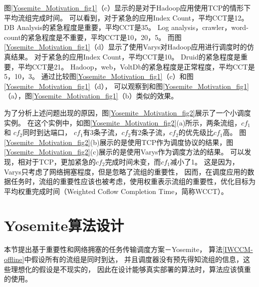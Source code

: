 图\ref{Yosemite_Motivation_fig1}（c）显示的是对于Hadoop应用使用TCP的情形下平均流组完成时间。
可以看到，对于紧急的应用Index Count，平均CCT是12。
DB Analysis的紧急程度是重要，平均CCT是35。
Log analysis，crawler，word-count的紧急程度是不重要，平均CCT是10，20，5。
而图\ref{Yosemite_Motivation_fig1}（d）显示了使用Varys对Hadoop应用进行调度时的仿真结果。
对于紧急的应用Index Count，平均CCT是10。
Druid的紧急程度是重要，平均CCT是21。
Hadoop，web，VoltDb的紧急程度是正常程度，平均CCT是5，10，3。
通过比较图\ref{Yosemite_Motivation_fig1}（c）和图\ref{Yosemite_Motivation_fig1}（d），
可以观察到和图\ref{Yosemite_Motivation_fig1}（a），图\ref{Yosemite_Motivation_fig1}（b）类似的效果。

为了分析上述问题出现的原因，图\ref{Yosemite_Motivation_fig2}展示了一个小调度实例。
在这个实例中，如图\ref{Yosemite_Motivation_fig2}(a)所示，两条流组，$cf_1$和 $cf_2$同时到达端口，
$cf_1$有3条子流，$cf_2$有2条子流，$cf_2$的优先级比$cf_1$高。
图\ref{Yosemite_Motivation_fig2}(b)展示的是使用TCP作为调度协议的结果，图\ref{Yosemite_Motivation_fig2}(c)展示的是使用Varys作为调度方法的结果。
可以发现，相对于TCP，更加紧急的$cf_2$完成时间未变，而$cf_1$减小了1。
这是因为，Varys只考虑了网络拥塞程度，但是忽略了流组的重要性，
因而，在调度应用的数据任务时，流组的重要性应该也被考虑，使用权重表示流组的重要性，优化目标为平均权重完成时间（Weighted Coflow Completion Time，简称WCCT）。


\section{Yosemite算法设计}
本节提出基于重要性和网络拥塞的任务传输调度方案－Yosemite，
算法\ref{IWCCM-offline}中假设所有的流组是同时到达，
并且调度器没有预先得知流组的信息，这些理想化的假设是不现实的，
 因此在设计能够真实部署的算法时，算法应该慎重的使用。

 

